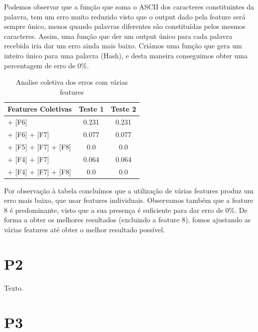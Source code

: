 \documentclass[11pt,twocolumn]{article}
\begin{document}
    Podemos observar que a função que soma o ASCII dos caracteres
    constituintes da palavra, tem um erro muito reduzido visto que o output dado pela feature será sempre único, menos quando palavras diferentes são constituídas pelos mesmos caracteres. 
    Assim, uma função que der um output único para cada palavra recebida iria dar um erro ainda mais baixo. Criámos uma função que gera um inteiro único para uma palavra (Hash), e desta maneira conseguimos obter uma percentagem de erro de 0\%.
    
    \begin{table}[htbp]
        \centering
        \caption{Analise coletiva dos erros com várias features}
        \label{my-label}
        \begin{tabular}{|l|c|c|}
        \hline
        \multicolumn{1}{|c|}{Features Coletivas}         & \textbf{Teste 1} & \textbf{Teste 2}                    \\ \hline
        [F5] + [F6] & 0.231 & 0.231 \\ \hline
        [F5] + [F6] + [F7]     & 0.077  & 0.077                   \\ \hline
        [F4] + [F5] + [F7] + [F8]   & 0.0              & 0.0                                 \\ \hline
        [F3] + [F4] + [F7]   & 0.064             & 0.064                                 \\ \hline
        [F3] + [F4] + [F7] + [F8]   & 0.0          & 0.0                                 \\ \hline
        \end{tabular}
        \end{table}
    \par  
    Por observação à tabela concluímos que a utilização de várias features produz um erro mais baixo, que usar features individuais. 
    Observamos também que a feature 8 é predominante, visto que a sua presença é suficiente para dar erro de 0\%. De forma a obter os melhores resultados (excluindo a feature 8), fomos ajustando as várias features até obter o melhor resultado possível.

\section*{P2}

Texto.

\section*{P3}
\end{document}
